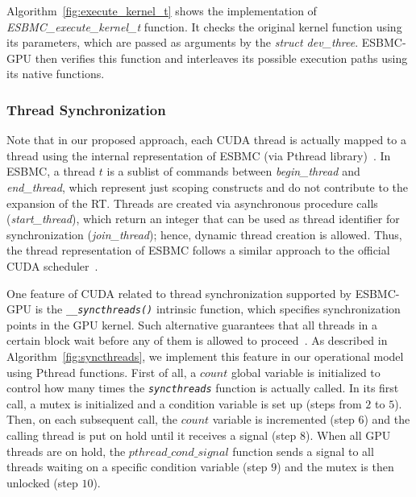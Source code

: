 \documentclass[times, doublespace]{cpeauth}
\begin{document}
Algorithm~\ref{fig:execute_kernel_t} shows the implementation of \textit{ESBMC\_execute\_kernel\_t} function. It checks the original kernel function using its parameters, which are passed as arguments by the \textit{struct dev\_three}. ESBMC-GPU then verifies this function and interleaves its possible execution paths using its native functions.

\subsubsection{Thread Synchronization}
\vspace{-2pt}
\label{sec:threadsynchronization}

Note that in our proposed approach, each CUDA thread is actually mapped to a thread using the internal representation of ESBMC (via Pthread library)~\cite{cordeiro:2011}. In ESBMC, a thread $t$ is a sublist of commands between \emph{begin\_thread} and \emph{end\_thread}, which represent just scoping constructs and do not contribute to the expansion of the RT. Threads are created via asynchronous procedure calls (\emph{start\_thread}), which return an integer that can be used as thread identifier for synchronization (\emph{join\_thread}); hence, dynamic thread creation is allowed. Thus, the thread representation of ESBMC follows a similar approach to the official CUDA scheduler~\cite{cuda:2012, gpu:2010, betts:2012}.

One feature of CUDA related to thread synchronization supported by ESBMC-GPU is the \emph{\tt \_\_syncthreads()} intrinsic function, which specifies synchronization points in the GPU kernel. Such alternative guarantees that all threads in a certain block wait before any of them is allowed to proceed~\cite{cuda:2012}. As described in Algorithm~\ref{fig:syncthreads}, we implement this feature in our operational model using Pthread functions. First of all, a $count$ global variable is initialized to control how many times the \emph{\tt syncthreads} function is actually called. In its first call, a mutex is initialized and a condition variable is set up (steps from $2$ to $5$). Then, on each subsequent call, the $count$ variable is incremented (step $6$) and the calling thread is put on hold until it receives a signal (step $8$). When all GPU threads are on hold, the $pthread\_cond\_signal$ function sends a signal to all threads waiting on a specific condition variable (step $9$) and the mutex is then unlocked (step $10$).
\end{document}
